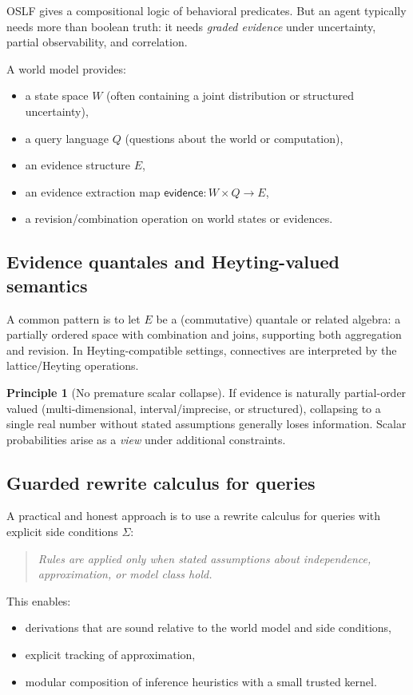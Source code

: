 \documentclass[11pt]{article}
\theoremstyle{definition}
\newtheorem{principle}{Principle}
\begin{document}
OSLF gives a compositional logic of behavioral predicates.
But an agent typically needs more than boolean truth:
it needs \emph{graded evidence} under uncertainty, partial observability, and correlation.

A world model provides:
\begin{itemize}[leftmargin=1.5em]
\item a state space $W$ (often containing a joint distribution or structured uncertainty),
\item a query language $Q$ (questions about the world or computation),
\item an evidence structure $E$,
\item an evidence extraction map $\mathsf{evidence} : W \times Q \to E$,
\item a revision/combination operation on world states or evidences.
\end{itemize}

\subsection{Evidence quantales and Heyting-valued semantics}

A common pattern is to let $E$ be a (commutative) quantale or related algebra:
a partially ordered space with combination and joins,
supporting both aggregation and revision.
In Heyting-compatible settings, connectives are interpreted by the lattice/Heyting operations.

\begin{principle}[No premature scalar collapse]
If evidence is naturally partial-order valued (multi-dimensional, interval/imprecise, or structured),
collapsing to a single real number without stated assumptions generally loses information.
Scalar probabilities arise as a \emph{view} under additional constraints.
\end{principle}

\subsection{Guarded rewrite calculus for queries}

A practical and honest approach is to use a rewrite calculus for queries with explicit side conditions $\Sigma$:
\begin{quote}
\emph{Rules are applied only when stated assumptions about independence, approximation, or model class hold.}
\end{quote}
This enables:
\begin{itemize}[leftmargin=1.5em]
\item derivations that are sound relative to the world model and side conditions,
\item explicit tracking of approximation,
\item modular composition of inference heuristics with a small trusted kernel.
\end{itemize}
\end{document}
